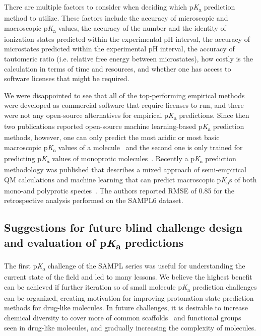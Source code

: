 \documentclass[9pt,lineno,final]{elife}
\newcommand{\pKa}{p\textit{K}\textsubscript{a}}
\begin{document}
There are multiple factors to consider when deciding which \pKa{} prediction method to utilize. These factors include the accuracy of microscopic and macroscopic \pKa{} values, the accuracy of the number and the identity of ionization states predicted within the experimental pH interval, the accuracy of microstates predicted within the experimental pH interval, the accuracy of tautomeric ratio (i.e. relative free energy between microstates), how costly is the calculation in terms of time and resources, and whether one has access to software licenses that might be required. 

We were disappointed to see that all of the top-performing empirical methods were developed as commercial software that require licenses to run, and there were not any open-source alternatives for empirical \pKa{} predictions. Since then two publications reported open-source machine learning-based \pKa{} prediction methods, however, one can only predict the most acidic or most basic macroscopic \pKa{} values of a molecule~\citep{Mansouri:2019:J.Cheminformatics} and the second one is only trained for predicting \pKa{} values of monoprotic molecules~\citep{Baltruschat:2020:F1000Research}. Recently a \pKa{} prediction methodology was published that describes a mixed approach of semi-empirical QM calculations and machine learning that can predict macroscopic \pKa{}s of both mono-and polyprotic species~\citep{Hunt:2020:J.Chem.Inf.Model.}. The authors reported RMSE of 0.85 for the retrospective analysis performed on the SAMPL6 dataset.



\subsection{Suggestions for future blind challenge design and evaluation of \pKa{} predictions}

The first \pKa{} challenge of the SAMPL series was useful for understanding the current state of the field and led to many lessons. We believe the highest benefit can be achieved if further iteration so of small molecule \pKa{} prediction challenges can be organized, creating motivation for improving protonation state prediction methods for drug-like molecules. 
In future challenges, it is desirable to increase chemical diversity to cover more of common scaffolds~\citep{Zdrazil:2018:J.Med.Chem.} and functional groups~\citep{Ertl:2020:J.Med.Chem.} seen in drug-like molecules, and gradually increasing the complexity of molecules.
\end{document}
